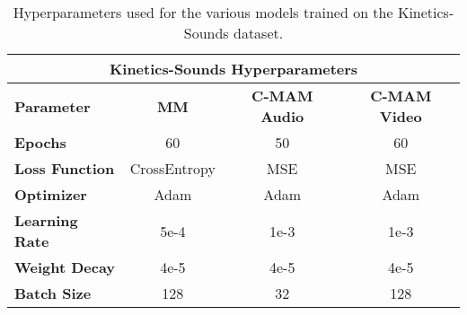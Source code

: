 \begin{table}[h!]
\footnotesize
\centering
\caption{Hyperparameters used for the various models trained on the Kinetics-Sounds dataset.}
\label{tab:ks_hypparams}
\begin{tabular}{lccc}
\hline
\multicolumn{4}{c}{\textbf{Kinetics-Sounds Hyperparameters}}             \\ \hline
\multicolumn{1}{l|}{\textbf{Parameter}} & \textbf{MM} & \textbf{C-MAM Audio} & \textbf{C-MAM Video} \\ \hline
\multicolumn{1}{l|}{\textbf{Epochs}}        & 60           & 50   & 60   \\
\multicolumn{1}{l|}{\textbf{Loss Function}} & CrossEntropy & MSE  & MSE  \\
\multicolumn{1}{l|}{\textbf{Optimizer}}     & Adam         & Adam & Adam \\
\multicolumn{1}{l|}{\textbf{Learning Rate}} & 5e-4         & 1e-3 & 1e-3 \\
\multicolumn{1}{l|}{\textbf{Weight Decay}}  & 4e-5         & 4e-5 & 4e-5 \\
\multicolumn{1}{l|}{\textbf{Batch Size}}    & 128          & 32   & 128  \\ \hline
\end{tabular}%
\end{table}
